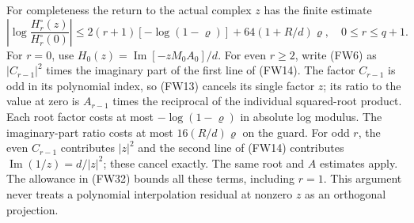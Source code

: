 \documentclass[11pt]{article}
\begin{document}
For completeness the return to the actual complex $z$ has the finite
estimate
\begin{equation}\tag{FW32}
 \left|\log\frac{H_r^\circ(z)}{H_r^\circ(0)}\right|
 \le 2(r+1)[-\log(1-\varrho)]+64(1+R/d)\varrho,
 \quad0\le r\le q+1.
\end{equation}
For $r=0$, use $H_0(z)=\operatorname{Im}[-zM_0 A_0]/d$.
For even $r\ge2$, write (FW6) as $|C_{r-1}|^2$ times the imaginary
part of the first line of (FW14). The factor $C_{r-1}$ is odd in its
polynomial index, so (FW13) cancels its single factor $z$; its ratio
to the value at zero is $A_{r-1}$ times the reciprocal of the individual
squared-root product. Each root factor costs at most
$-\log(1-\varrho)$ in absolute log modulus. The imaginary-part ratio
costs at most $16(R/d)\varrho$ on the guard. For odd $r$, the even
$C_{r-1}$ contributes $|z|^2$ and the second line of (FW14) contributes
$\operatorname{Im}(1/z)=d/|z|^2$; these cancel exactly. The same root
and $A$ estimates apply. The allowance in (FW32) bounds all these
terms, including $r=1$. This argument never treats a polynomial
interpolation residual at nonzero $z$ as an orthogonal projection.
\end{document}
